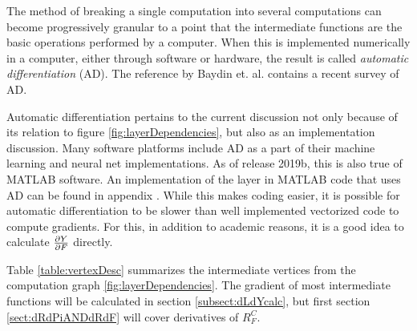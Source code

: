 The method of breaking a single computation into several computations can become progressively granular to a point that the intermediate functions are the basic operations performed by a computer. When this is implemented numerically in a computer, either through software or hardware, the result is called \textit{automatic differentiation} (AD).  The reference by Baydin et. al. \cite{baydin2017automatic} contains a recent survey of AD.  

Automatic differentiation pertains to the current discussion not only because of its relation to figure \ref{fig:layerDependencies}, but also as an implementation discussion. Many software platforms include AD as a part of their machine learning and neural net implementations. As of release 2019b, this is also true of MATLAB software.  An implementation of the \RS layer in MATLAB code  that uses AD can be found in appendix .  While this makes coding easier, it is possible for automatic differentiation to be slower than well implemented vectorized code to compute gradients.  For this, in addition to academic reasons, it is a good idea to calculate \( \pdv{Y}{F} \) directly.

Table \ref{table:vertexDesc} summarizes the intermediate vertices from the computation graph \ref{fig:layerDependencies}.  The gradient of most intermediate functions will be calculated in section \ref{subsect:dLdYcalc}, but first section \ref{sect:dRdPiANDdRdF} will cover derivatives of \( R_F^C \).

